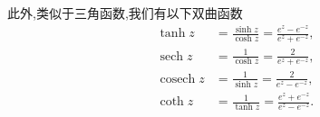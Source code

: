 此外,类似于三角函数,我们有以下双曲函数
\begin{equation}
    \begin{aligned}
    \tanh z & =\frac{\sinh z}{\cosh z}=\frac{e^z-e^{-z}}{e^z+e^{-z}}, \\
    \operatorname{sech} z & =\frac{1}{\cosh z}=\frac{2}{e^z+e^{-z}}, \\
    \operatorname{cosech} z & =\frac{1}{\sinh z}=\frac{2}{e^z-e^{-z}}, \\
    \operatorname{coth} z & =\frac{1}{\tanh z}=\frac{e^z+e^{-z}}{e^z-e^{-z}} . 
    \end{aligned}
\end{equation}



%     

